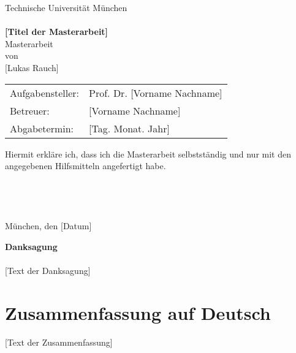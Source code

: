 \documentclass[german,a4paper,12pt,oneside]{scrbook}
\theoremstyle{definition}
\theoremstyle{definition}
\theoremstyle{definition}
\theoremstyle{definition}
\theoremstyle{definition}
\theoremstyle{definition}
\begin{document}
\vspace*{1.5cm}
\begin{center}
{\Huge Technische Universit\"at M\"unchen} 
\\
\vspace*{1.5cm}
{\huge {}} 
\\
\vspace*{3cm}
{\Huge {\bf [Titel der Masterarbeit]}}
\\
\vspace*{3cm}
{\Large Masterarbeit}\linebreak \\ 
{\Large von}\linebreak \\
{\Large [Lukas Rauch]}\\
\vspace*{3cm}
{\Large 
\begin{tabular}{ll}
Aufgabensteller: & Prof. Dr. [Vorname Nachname]\\
Betreuer: & [Vorname Nachname]\\
Abgabetermin: & [Tag. Monat. Jahr]
\end{tabular}
}
\end{center}
\newpage    %

\vspace*{18cm}
\noindent
Hiermit erkl\"are ich, dass ich die Masterarbeit selbstst\"andig und nur mit den angegebenen Hilfsmitteln angefertigt habe.
\\
\\
\\
\\
\\
München, den [Datum]
\newpage

\vspace*{2.2cm}
\noindent %
{\Huge {\bf Danksagung}} \\
\vspace*{1.6cm} \\
\pagestyle{headings}
[Text der Danksagung]

\newpage
\section*{Zusammenfassung auf Deutsch}
[Text der Zusammenfassung]
\end{document}
